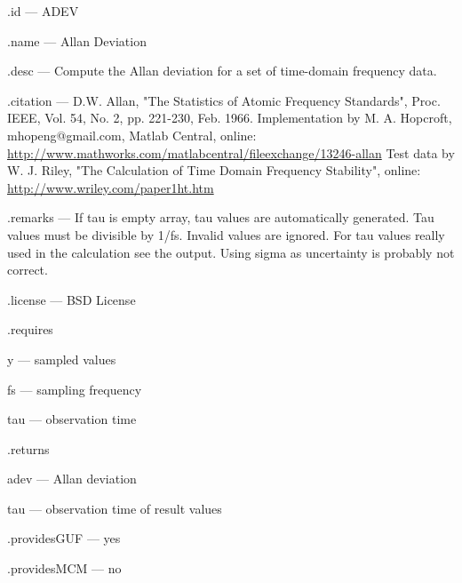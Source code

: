 \begin{tightdesc}
\item [\textsf{.id}] --- ADEV
\item [\textsf{.name}] --- Allan Deviation
\item [\textsf{.desc}] --- Compute the Allan deviation for a set of time-domain frequency data.
\item [\textsf{.citation}] --- D.W. Allan, "The Statistics of Atomic Frequency Standards", Proc. IEEE, Vol. 54, No. 2, pp. 221-230, Feb. 1966. Implementation by M. A. Hopcroft, mhopeng@gmail.com, Matlab Central, online: \url{http://www.mathworks.com/matlabcentral/fileexchange/13246-allan} Test data by W. J. Riley, "The Calculation of Time Domain Frequency Stability", online: \url{http://www.wriley.com/paper1ht.htm}
\item [\textsf{.remarks}] --- If tau is empty array, tau values are automatically generated. Tau values must be divisible by 1/fs. Invalid values are ignored. For tau values really used in the calculation see the output. Using sigma as uncertainty is probably not correct.
\item [\textsf{.license}] --- BSD License
\item [\textsf{.requires}] \rule{0em}{0em}
\begin{tightdesc}
\item [\textsf{y}] --- sampled values
\item [\textsf{fs}] --- sampling frequency
\item [\textsf{tau}] --- observation time
\end{tightdesc}
\item [\textsf{.returns}] \rule{0em}{0em}
\begin{tightdesc}
\item [\textsf{adev}] --- Allan deviation
\item [\textsf{tau}] --- observation time of result values
\end{tightdesc}
\item [\textsf{.providesGUF}] --- yes
\item [\textsf{.providesMCM}] ---  no
\end{tightdesc}

